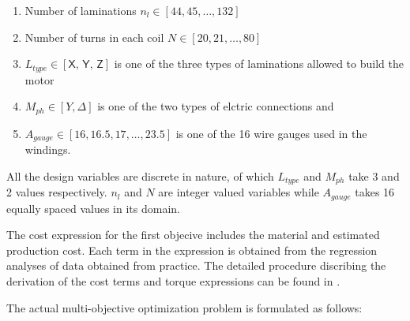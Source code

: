 \begin{enumerate}
\item Number of laminations $n_l \in [44, 45,\dots ,132]$

\item Number of turns in each coil  $N \in [20, 21, \dots, 80]$

\item $L_{type} \in [\textsf{X, Y, Z}]$ is one of the three types of 
laminations allowed to build the motor

\item $M_{ph} \in [Y, \Delta ]$ is one of the two types of elctric 
connections and

\item $A_{gauge} \in [16, 16.5, 17, \dots , 23.5]$ is one of the 16 
wire gauges used in the windings.
\end{enumerate}

All the design variables are discrete in nature, of which $L_{type}$ 
and $M_{ph}$ take 3 and 2 values respectively. $n_l$ and $N$ are 
integer valued variables while $A_{gauge}$ takes 16 equally spaced 
values in its domain.

The cost expression for the first objecive includes the material and
estimated production cost. Each term in the expression is obtained 
from the regression analyses of data obtained from practice. The 
detailed procedure discribing the derivation of the cost terms and 
torque expressions can be found in \cite{chidambaram1999}.

The actual multi-objective optimization problem is formulated as 
follows:




